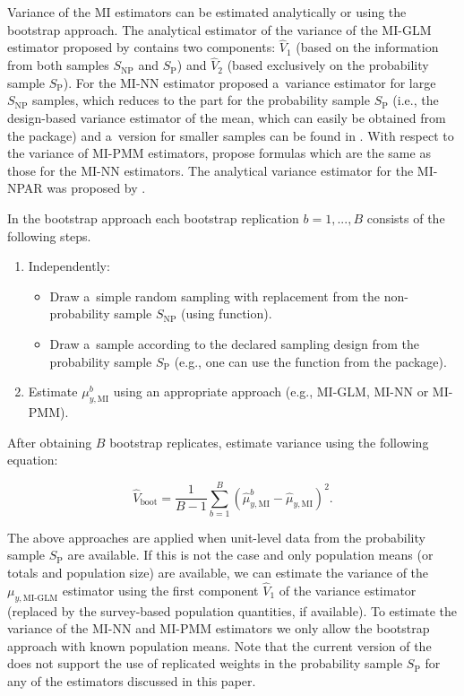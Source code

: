 \documentclass[nojss]{jss}
\begin{document}
Variance of the MI estimators can be estimated analytically or using the
bootstrap approach. The analytical estimator of the variance of the
MI-GLM estimator proposed by \citet[p. 950]{kim_combining_2021} contains
two components: \(\hat{V}_1\) (based on the information from both
samples \(S_{\text{NP}}\) and \(S_{\text{P}}\)) and \(\hat{V}_2\) (based
exclusively on the probability sample \(S_{\text{P}}\)). For the MI-NN
estimator \citet{yang2021integration} proposed a~variance estimator for
large \(S_{\text{NP}}\) samples, which reduces to the part for the
probability sample \(S_{\text{P}}\) (i.e., the design-based variance
estimator of the mean, which can easily be obtained from the
 package) and a~version for smaller samples can be found in
\citet{chlebicki2025}. With respect to the variance of MI-PMM
estimators, \citet{chlebicki2025} propose formulas which are the same as
those for the MI-NN estimators. The analytical variance estimator for
the MI-NPAR was proposed by \citet{chen_nonparametric_2022}.

In the bootstrap approach each bootstrap replication \(b=1,...,B\)
consists of the following steps.

\begin{enumerate}
\item Independently:
  \begin{itemize}
  \item Draw a~simple random sampling with replacement from the non-probability sample $S_{\text{NP}}$ (using  function).
  \item Draw a~sample according to the declared sampling design from the probability sample $S_{\text{P}}$ (e.g., one can use the  function from the  package).
  \end{itemize}
\item Estimate $\mu_{y, \text{MI}}^b$ using an appropriate approach (e.g., MI-GLM, MI-NN or MI-PMM).
\end{enumerate}

After obtaining \(B\) bootstrap replicates, estimate variance using the
following equation:

\begin{equation}
\hat{V}_{\text{boot}} = \frac{1}{B-1}\sum_{b=1}^B\left(\hat{\mu}^b_{y, \text{MI}} - \hat{\mu}_{y, \text{MI}}\right)^2.
\label{eq-var-bootstrap}
\end{equation}

The above approaches are applied when unit-level data from the
probability sample \(S_{\text{P}}\) are available. If this is not the
case and only population means (or totals and population size) are
available, we can estimate the variance of the \(\mu_{y,\text{MI-GLM}}\)
estimator using the first component \(\hat{V}_1\) of the
\citet{kim_combining_2021} variance estimator (replaced by the
survey-based population quantities, if available). To estimate the
variance of the MI-NN and MI-PMM estimators we only allow the bootstrap
approach with known population means. Note that the current version of
the  does not support the use of replicated weights in
the probability sample \(S_{\text{P}}\) for any of the estimators
discussed in this paper.
\end{document}
